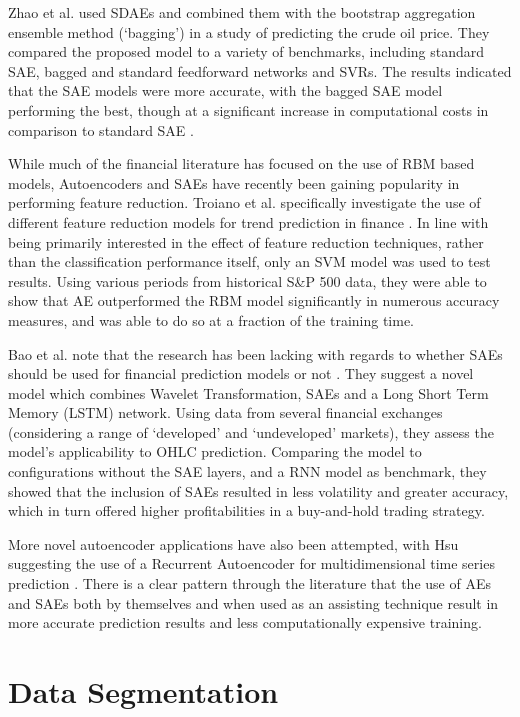 \documentclass[a4paper,latin]{paper}
\begin{document}
Zhao et al. used SDAEs and combined them with the bootstrap aggregation ensemble method (‘bagging’) in a 
study of predicting the crude oil price. They compared the proposed model to a variety of benchmarks, including 
standard SAE, bagged and standard feedforward networks and SVRs. The results indicated that the SAE models 
were more accurate, with the bagged SAE model performing the best, though at a significant increase in 
computational costs in comparison to standard SAE \cite{Zhao}.
\hfill \break 

While much of the financial literature has focused on the use of RBM based models, Autoencoders and SAEs have 
recently been gaining popularity in performing feature reduction. Troiano et al. specifically investigate the use of 
different feature reduction models for trend prediction in finance \cite{Troiano}. In line with being primarily 
interested in the effect of feature reduction techniques, rather than the classification performance itself, only an 
SVM model was used to test results. Using various periods from historical S\&P 500 data, they were able to show 
that AE outperformed the RBM model significantly in numerous accuracy measures, and was able to do so at a 
fraction of the training time.
\hfill \break 

Bao et al.  note that the research has been lacking with regards to whether SAEs should be used for 
financial prediction models or not \cite{Bao}. They suggest a novel model which combines Wavelet Transformation, SAEs 
and a Long Short Term Memory (LSTM) network. Using data from several financial exchanges (considering a 
range of ‘developed’ and ‘undeveloped’ markets), they assess the model’s applicability to OHLC prediction. 
Comparing the model to configurations without the SAE layers, and a RNN model as benchmark, they showed 
that the inclusion of SAEs resulted in less volatility and greater accuracy, which in turn offered higher profitabilities 
in a buy-and-hold trading strategy.
\hfill \break 

More novel autoencoder applications have also been attempted, with Hsu suggesting the use of a 
Recurrent Autoencoder for multidimensional time series prediction \cite{Hsu}. There is a clear pattern through the literature 
that the use of AEs and SAEs both by themselves and when used as an assisting technique result in more accurate 
prediction results and less computationally expensive training.

\section{Data Segmentation}
\hfill
\end{document}
